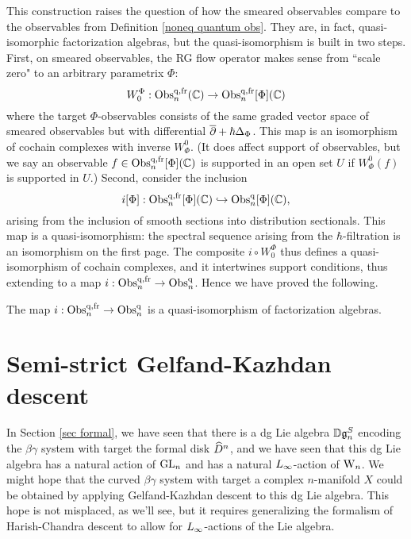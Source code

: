 This construction raises the question of how the smeared observables compare to the observables from Definition \ref{noneq quantum obs}.
They are, in fact, quasi-isomorphic factorization algebras, but the quasi-isomorphism is built in two steps.
First, on smeared observables, the RG flow operator makes sense from ``scale zero" to an arbitrary parametrix $\Phi$:
\[
W_0^\Phi: {\rm Obs}^{{\rm q},{\rm fr}}_n(\mathbb C) \to {\rm Obs}^{{\rm q},{\rm fr}}_n[\Phi](\mathbb C)
\]
where the target $\Phi$-observables consists of the same graded vector space of smeared observables 
but with differential $\overline{\partial} +\hbar \Delta_\Phi$.
This map is an isomorphism of cochain complexes with inverse $W_\Phi^0$.
(It does affect support of observables, but we say an observable $f \in {\rm Obs}^{{\rm q},{\rm fr}}_n[\Phi](\mathbb C)$ is supported in an open set $U$
if $W_\Phi^0(f)$ is supported in $U$.)
Second, consider the inclusion
\[
i[\Phi]: {\rm Obs}^{{\rm q},{\rm fr}}_n[\Phi](\mathbb C) \hookrightarrow {\rm Obs}^{{\rm q}}_n[\Phi](\mathbb C),
\]
arising from the inclusion of smooth sections into distribution sectionals. 
This map is a quasi-isomorphism: the spectral sequence arising from the $\hbar$-filtration is an isomorphism on the first page.
The composite $i \circ W_0^\Phi$ thus defines a quasi-isomorphism of cochain complexes,
and it intertwines support conditions, thus extending to a map $i: {\rm Obs}^{{\rm q},{\rm fr}}_n \to {\rm Obs}^{{\rm q}}_n$.
Hence we have proved the following.

\begin{prop}
\label{equiv of noneq}
The map $i: {\rm Obs}^{{\rm q},{\rm fr}}_n \to {\rm Obs}^{{\rm q}}_n$ is a quasi-isomorphism of factorization algebras.
\end{prop}

\section{Semi-strict Gelfand-Kazhdan descent}
\label{sec ss GK descent}

In Section \ref{sec formal}, we have seen that there is a dg Lie algebra $\mathbb D \mathfrak{g}_n^S$ 
encoding the $\beta\gamma$ system with target the formal disk $\widehat{D}^n$, 
and we have seen that this dg Lie algebra has a natural action of ${\rm GL}_n$ and has a natural $\L8$-action of ${{\rm W}_n}$. 
We might hope that the curved $\beta\gamma$ system with target a complex $n$-manifold $X$ could be obtained 
by applying Gelfand-Kazhdan descent to this dg Lie algebra.
This hope is not misplaced, as we'll see, 
but it requires generalizing the formalism of Harish-Chandra descent to allow for $\L8$-actions of the Lie algebra.

